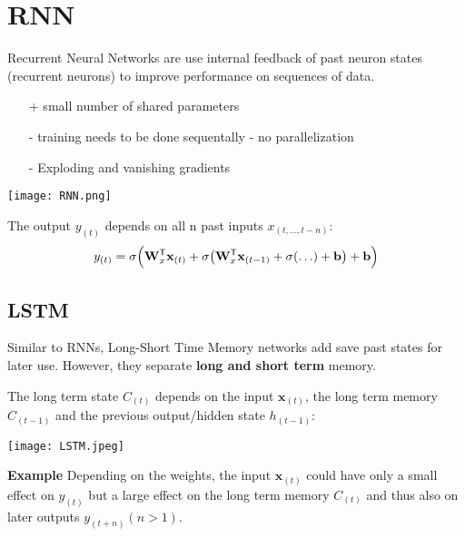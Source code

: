 \section{RNN}\label{sec:RNN} %
Recurrent Neural Networks are use internal feedback of past neuron states (recurrent neurons) to improve performance on sequences of data.
\begin{itemize}
    \item[+] small number of shared parameters
    \item[-] training needs to be done sequentally - no parallelization
    \item[-] Exploding and vanishing gradients
\end{itemize}
\newpar{}
\begin{center}
    \texttt{[image: RNN.png]}
\end{center}
The output $y_{(t)}$ depends on all n past inputs $x_{(t,\ldots,t-n)}$:
\noindent\begin{equation*}
    y_{(t)} = \sigma\Bigl(\mathbf{W}_x^{\mathsf{T}}\mathbf{x}_{(t)} + \sigma\bigl(\mathbf{W}_x^{\mathsf{T}}\mathbf{x}_{(t-1)} + \sigma( \ldots ) + \mathbf{b}\bigr) + \mathbf{b}\Bigr)
\end{equation*}

\subsection{LSTM}
Similar to RNNs, Long-Short Time Memory networks add save past states for later use. However, they separate \textbf{long and short term} memory.

The long term state $C_{(t)}$ depends on the input $\mathbf{x}_{(t)}$, the long term memory $C_{(t-1)}$ and the previous output/hidden state $h_{(t-1)}$:
\begin{center}
    \texttt{[image: LSTM.jpeg]}
\end{center}

\textbf{Example}
Depending on the weights, the input $\mathbf{x}_{(t)}$ could have only a small effect on $y_{(t)}$ but a large effect on the long term memory $C_{(t)}$ and thus also on later outputs $y_{(t+n)} (n>1)$.